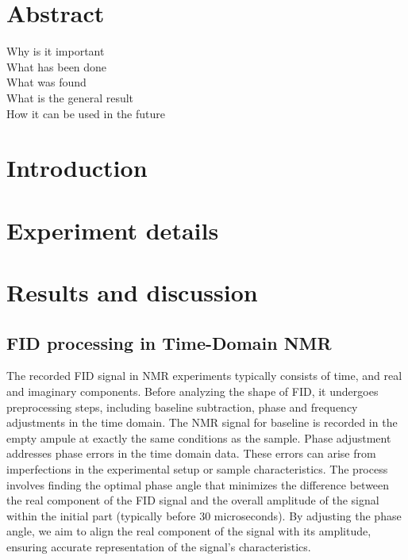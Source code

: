 \documentclass[a4paper,12pt]{article}
\begin{document}
\maketitle %
\section*{Abstract}

Why is it important\\
What has been done\\
What was found\\
What is the general result\\
How it can be used in the future\\

\newpage
\section{Introduction}

\newpage
\section{Experiment details}

\newpage
\section{Results and discussion}\label{sec:Results and discussion}
\subsection{FID processing in Time-Domain NMR}\label{sec:FID processing in Time-Domain NMR}

The recorded FID signal in NMR experiments typically consists of time, and real and imaginary components. 
Before analyzing the shape of FID, it undergoes preprocessing steps, including baseline subtraction, phase and frequency adjustments in the time domain.
The NMR signal for baseline is recorded in the empty ampule at exactly the same conditions as the sample. 
Phase adjustment addresses phase errors in the time domain data. 
These errors can arise from imperfections in the experimental setup or sample characteristics. 
The process involves finding the optimal phase angle that minimizes the difference between the real component of the FID signal and the overall amplitude of the signal within the initial part (typically before 30 microseconds). 
By adjusting the phase angle, we aim to align the real component of the signal with its amplitude, ensuring accurate representation of the signal's characteristics.
\end{document}
